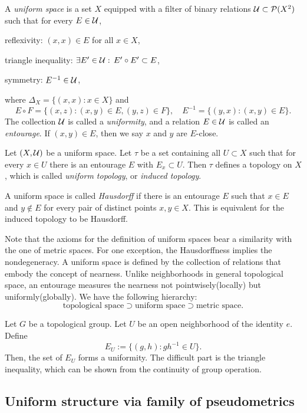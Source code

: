 \documentclass{../exp}
\begin{document}
\begin{defn}
A \emph{uniform space} is a set $X$ equipped with a filter of binary relations $\mathcal{U}\subset\mathcal{P}(X^2)$ such that for every $E\in\mathcal{U}$,
\begin{cond}
\item reflexivity: $(x,x)\in E$ for all $x\in X$,
\item triangle inequality: $\exists E'\in\mathcal{U}:\,E'\circ E'\subset E$,
\item symmetry: $E^{-1}\in\mathcal{U}$,
\end{cond}
where $\Delta_X=\{(x,x):x\in X\}$ and
\[E\circ F=\{(x,z):(x,y)\in E,(y,z)\in F\},\quad E^{-1}=\{(y,x):(x,y)\in E\}.\]
The collection $\mathcal{U}$ is called a \emph{uniformity}, and a relation $E\in\mathcal{U}$ is called an \emph{entourage}.
If $(x,y)\in E$, then we say $x$ and $y$ are $E$-close.
\end{defn}
\begin{defn}
Let $(X,\mathcal{U})$ be a uniform space.
Let $\tau$ be a set containing all $U\subset X$ such that for every $x\in U$ there is an entourage $E$ with $E_x\subset U$.
Then $\tau$ defines a topology on $X$, which is called \emph{uniform topology}, or \emph{induced topology}.
\end{defn}
\begin{defn}
A uniform space is called \emph{Hausdorff} if there is an entourage $E$ such that $x\in E$ and $y\notin E$ for every pair of distinct points $x,y\in X$.
This is equivalent for the induced topology to be Hausdorff.
\end{defn}

Note that the axioms for the definition of uniform spaces bear a similarity with the one of metric spaces.
For one exception, the Hausdorffness implies the nondegeneracy.
A uniform space is defined by the collection of relations that embody the concept of nearness.
Unlike neighborhoods in general topological space, an entourage measures the nearness not pointwisely(locally) but uniformly(globally).
We have the following hierarchy:
\[\text{topological space} \supset \text{uniform space} \supset \text{metric space}.\]
\begin{ex}
Let $G$ be a topological group.
Let $U$ be an open neighborhood of the identity $e$.
Define
\[E_U:=\{(g,h):gh^{-1}\in U\}.\]
Then, the set of $E_U$ forms a uniformity.
The difficult part is the triangle inequality, which can be shown from the continuity of group operation.
\end{ex}

\subsection{Uniform structure via family of pseudometrics}
\end{document}
